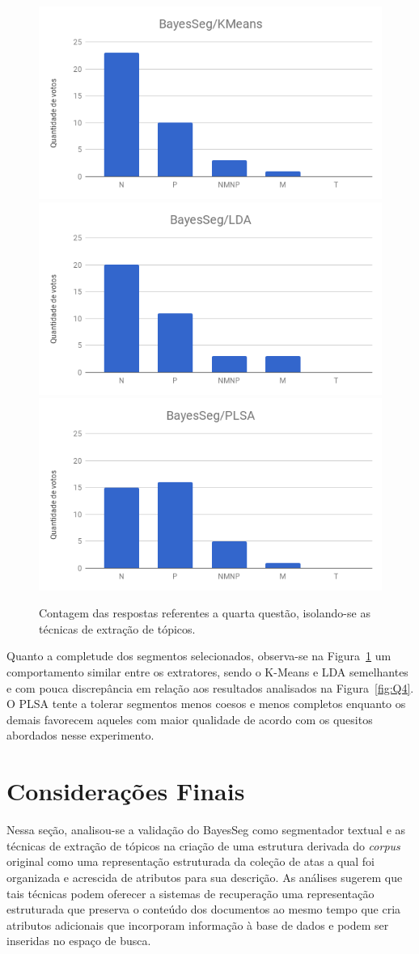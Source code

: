 \begin{figure}[!h] \centering     %

		\includegraphics[width=.31\textwidth]{conteudo/capitulos/figs/figuras-experimento/t1q4.png}
		\includegraphics[width=.31\textwidth]{conteudo/capitulos/figs/figuras-experimento/t2q4.png}
		\includegraphics[width=.31\textwidth]{conteudo/capitulos/figs/figuras-experimento/t3q4.png}

	\caption{Contagem das respostas referentes a quarta questão, isolando-se as técnicas de extração de tópicos.}
	\label{fig:influenciaExtSegQ4}
\end{figure}


Quanto a completude dos segmentos selecionados, 
observa-se na Figura~\ref{fig:influenciaExtSegQ4} 
um comportamento similar entre os extratores, sendo o K-Means e LDA semelhantes e com pouca discrepância em relação aos resultados analisados na Figura~\ref{fig:Q4}. O PLSA tente a tolerar segmentos menos coesos e menos completos enquanto os demais favorecem aqueles com maior qualidade de acordo com os quesitos abordados nesse experimento.




\section{Considerações Finais}

Nessa seção, analisou-se a validação do BayesSeg como segmentador textual e as técnicas de extração de tópicos na criação de uma estrutura derivada do \textit{corpus} original como uma representação estruturada da coleção de atas a qual foi organizada e acrescida de atributos para sua descrição. As análises sugerem que tais técnicas podem oferecer a sistemas de recuperação uma representação estruturada que preserva o conteúdo dos documentos ao mesmo tempo que cria atributos adicionais que incorporam informação à base de dados e podem ser inseridas no espaço de busca.  


